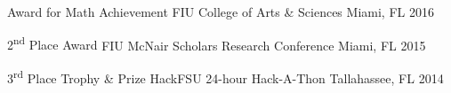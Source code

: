 




\begin{cvhonors}


    \cvhonor
    {Award for Math Achievement} %
    {FIU College of Arts \& Sciences} %
    {Miami, FL} %
    {2016} %


    \cvhonor
    {2\textsuperscript{nd} Place Award} %
    {FIU McNair Scholars Research Conference} %
    {Miami, FL} %
    {2015} %


    \cvhonor
    {3\textsuperscript{rd} Place Trophy \& Prize} %
    {HackFSU 24-hour Hack-A-Thon} %
    {Tallahassee, FL} %
    {2014} %






\end{cvhonors}
